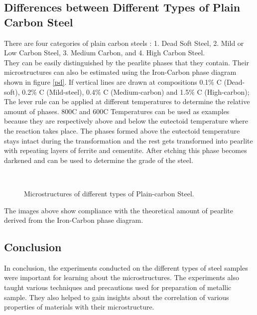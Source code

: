 \documentclass[12pt,a4paper]{article}
\begin{document}
\subsection{Differences between Different Types of Plain Carbon Steel} 

There are four categories of plain carbon steels :
1. Dead Soft Steel,
 2. Mild or Low Carbon Steel,
 3. Medium Carbon,
 and 4. High Carbon Steel.\\
 
They can be easily distinguished by the pearlite phases that they contain. Their microstructures can also be estimated using the Iron-Carbon phase diagram shown in figure \ref{pd}. If vertical lines are drawn at compositions 0.1\% C (Dead-soft), 0.2\% C (Mild-steel), 0.4\% C (Medium-carbon) and 1.5\% C (High-carbon); The lever rule can be applied at different temperatures to determine the relative amount of phases. 800\degree C and 600\degree C Temperatures can be used as examples because they are respectively above and below the eutectoid temperature where the  reaction takes place. The phases formed above the eutectoid temperature stays intact during the transformation and the rest gets transformed into pearlite with repeating layers of ferrite and cementite. After etching this phase becomes darkened and can be used to determine the grade of the steel.\cite{camp}


\begin{figure}[H]%
    \centering
    \quad
    \\
    \quad
    \caption{Microstructures of different types of Plain-carbon Steel.}%
    \label{mics}%
\end{figure}

The images above show compliance with the theoretical amount of pearlite derived from the Iron-Carbon phase diagram.
\subsection{Conclusion}

In conclusion, the experiments conducted on the different types of steel samples were important for learning about the microstructures. The experiments also taught various techniques and precautions used for preparation of metallic sample. They also helped to gain insights about the correlation of various properties of materials with their microstructure.
\cleardoublepage
\printbibliography
\end{document}
